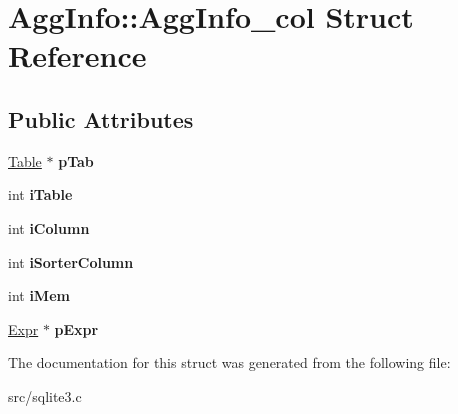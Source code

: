 \hypertarget{struct_agg_info_1_1_agg_info__col}{\section{Agg\-Info\-:\-:Agg\-Info\-\_\-col Struct Reference}
\label{struct_agg_info_1_1_agg_info__col}
}
\subsection*{Public Attributes}
\begin{DoxyCompactItemize}
\item 
\hypertarget{struct_agg_info_1_1_agg_info__col_ad2f2ae137b49e72d28a57accc9d06386}{\hyperlink{struct_table}{Table} $\ast$ {\bfseries p\-Tab}}\label{struct_agg_info_1_1_agg_info__col_ad2f2ae137b49e72d28a57accc9d06386}

\item 
\hypertarget{struct_agg_info_1_1_agg_info__col_ab49aa2fbfc6278c86b64497a6807c113}{int {\bfseries i\-Table}}\label{struct_agg_info_1_1_agg_info__col_ab49aa2fbfc6278c86b64497a6807c113}

\item 
\hypertarget{struct_agg_info_1_1_agg_info__col_a4cad2ce99ddf7425d358d49e40524f6b}{int {\bfseries i\-Column}}\label{struct_agg_info_1_1_agg_info__col_a4cad2ce99ddf7425d358d49e40524f6b}

\item 
\hypertarget{struct_agg_info_1_1_agg_info__col_ae3901ad0d5b6d519a7559358f1f7248b}{int {\bfseries i\-Sorter\-Column}}\label{struct_agg_info_1_1_agg_info__col_ae3901ad0d5b6d519a7559358f1f7248b}

\item 
\hypertarget{struct_agg_info_1_1_agg_info__col_ae22f3dfc6f9c2dc647be1b9fbd14e896}{int {\bfseries i\-Mem}}\label{struct_agg_info_1_1_agg_info__col_ae22f3dfc6f9c2dc647be1b9fbd14e896}

\item 
\hypertarget{struct_agg_info_1_1_agg_info__col_a60f23ec0abfcc88cab7083967a3abd9e}{\hyperlink{struct_expr}{Expr} $\ast$ {\bfseries p\-Expr}}\label{struct_agg_info_1_1_agg_info__col_a60f23ec0abfcc88cab7083967a3abd9e}

\end{DoxyCompactItemize}


The documentation for this struct was generated from the following file\-:\begin{DoxyCompactItemize}
\item 
src/sqlite3.\-c\end{DoxyCompactItemize}
